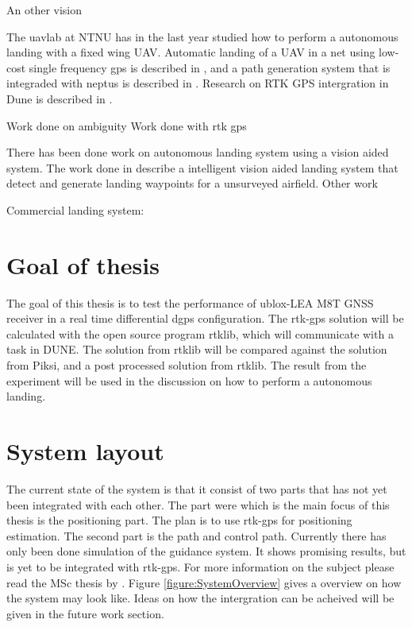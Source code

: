 An other vision \citep{kim2013fully}

The uavlab at NTNU has in the last year studied how to perform a autonomous landing with a fixed wing UAV. Automatic landing of a UAV in a net using low-cost single frequency gps is described in \citep{Skulstad&Syversen}, and a path generation system that is integraded with neptus is described in \citep{Froelich}. Research on RTK GPS intergration in Dune is described in \citep{Spockeli}.

Work done on ambiguity
\cite{Ambiguity:Estimation,LAMBDA:METHOD,LAMBDAMETHOD,GeodeticBaselines} 
Work done with rtk gps
\citep{Low-costRTK}  \citep{3D-RTK}

There has been done work on autonomous landing system using a vision aided system. The work done in \citep{williams2012intelligent} describe a intelligent vision aided landing system that detect and generate landing waypoints for a unsurveyed airfield. Other work 

Commercial landing system:  \citep{scanealge}

\section{Goal of thesis}
The goal of this thesis is to test the performance of ublox-LEA M8T GNSS receiver in a real time differential \gls{dgps} configuration. The \gls{rtk-gps} solution will be calculated with the open source program rtklib, which will communicate with a task in DUNE. The solution from rtklib will be compared against the solution from Piksi, and a post processed solution from rtklib. The result from the experiment will be used in the discussion on how to perform a autonomous landing.

\section{System layout}
The current state of the system is that it consist of two parts that has not yet been integrated with each other. The part were which is the main focus of this thesis is the positioning part. The plan is to use \gls{rtk-gps} for positioning estimation. The second part is the path and control path. Currently there has only been done simulation of the guidance system. It shows promising results, but is yet to be integrated with \gls{rtk-gps}. For more information on the subject please read the MSc thesis by \citep{Froelich}. Figure \ref{figure:SystemOverview} gives a overview on how the system may look like. Ideas on how the intergration can be acheived will be given in the future work section. 

